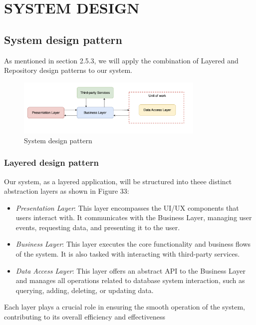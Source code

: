 \chapter{SYSTEM DESIGN}

\section{System design pattern}

As mentioned in section 2.5.3, we will apply the combination of Layered and Repository design patterns to our system.

\begin{figure}[H]
    \centering
    \includegraphics[width=0.8\textwidth]{Figures/design_pattern.png}
    \caption{System design pattern}
\end{figure}

\subsection{Layered design pattern}
Our system, as a layered application, will be structured into theee
distinct abstraction layers as shown in Figure 33:

\begin{itemize}
    \item
          \emph{Presentation Layer}: This layer encompasses the UI/UX components
          that users interact with. It communicates with the Business Layer,
          managing user events, requesting data, and presenting it to the user.
    \item
          \emph{Business Layer}: This layer executes the core functionality and
          business flows of the system. It is also tasked with interacting with
          third-party services.
    \item
          \emph{Data Access Layer}: This layer offers an abstract API to the
          Business Layer and manages all operations related to database system
          interaction, such as querying, adding, deleting, or updating data.
\end{itemize}

Each layer plays a crucial role in ensuring the smooth operation of the
system, contributing to its overall efficiency and effectiveness

